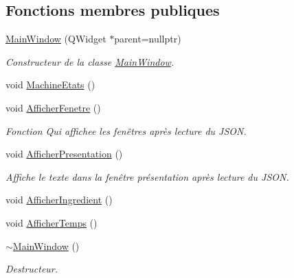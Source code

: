 \subsection*{Fonctions membres publiques}
\begin{DoxyCompactItemize}
\item 
\hyperlink{class_main_window_a996c5a2b6f77944776856f08ec30858d}{Main\+Window} (Q\+Widget $\ast$parent=nullptr)
\begin{DoxyCompactList}\small\item\em Constructeur de la classe \hyperlink{class_main_window}{Main\+Window}. \end{DoxyCompactList}\item 
void \hyperlink{class_main_window_a59cd9a83e43405ae1ad5c18e79b04db5}{Machine\+Etats} ()
\item 
void \hyperlink{class_main_window_a7f4b9726171670ec8d85bb6b09e0665d}{Afficher\+Fenetre} ()
\begin{DoxyCompactList}\small\item\em Fonction Qui affichee les fenêtres après lecture du J\+S\+ON. \end{DoxyCompactList}\item 
void \hyperlink{class_main_window_a9bf06dfcc398454facb39e71ebf32550}{Afficher\+Presentation} ()
\begin{DoxyCompactList}\small\item\em Affiche le texte dans la fenêtre présentation après lecture du J\+S\+ON. \end{DoxyCompactList}\item 
void \hyperlink{class_main_window_ad4059abf16eb904f988371b3791002bf}{Afficher\+Ingredient} ()
\item 
void \hyperlink{class_main_window_a33811a52abf8f1ce71ec4e150d9c9ac8}{Afficher\+Temps} ()
\item 
\hyperlink{class_main_window_ae98d00a93bc118200eeef9f9bba1dba7}{$\sim$\+Main\+Window} ()
\begin{DoxyCompactList}\small\item\em Destructeur. \end{DoxyCompactList}\end{DoxyCompactItemize}
